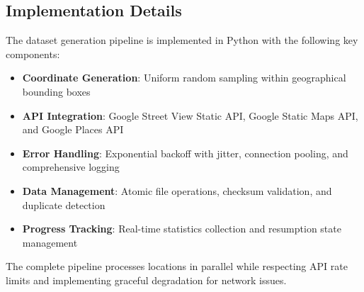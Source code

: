 \subsection{Implementation Details}

The dataset generation pipeline is implemented in Python with the following key components:

\begin{itemize}
    \item \textbf{Coordinate Generation}: Uniform random sampling within geographical bounding boxes
    \item \textbf{API Integration}: Google Street View Static API, Google Static Maps API, and Google Places API
    \item \textbf{Error Handling}: Exponential backoff with jitter, connection pooling, and comprehensive logging
    \item \textbf{Data Management}: Atomic file operations, checksum validation, and duplicate detection
    \item \textbf{Progress Tracking}: Real-time statistics collection and resumption state management
\end{itemize}

The complete pipeline processes locations in parallel while respecting API rate limits and implementing graceful degradation for network issues.